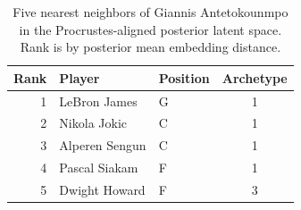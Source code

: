 \begin{table}[htbp]
  \centering\small
  \begin{tabular}{rllc}
    \toprule
    Rank & Player & Position & Archetype \\
    \midrule
    1 & LeBron James & G & 1 \\
    2 & Nikola Jokic & C & 1 \\
    3 & Alperen Sengun & C & 1 \\
    4 & Pascal Siakam & F & 1 \\
    5 & Dwight Howard & F & 3 \\
    \bottomrule
  \end{tabular}
  \caption{Five nearest neighbors of Giannis Antetokounmpo in the Procrustes-aligned posterior latent space. Rank is by posterior mean embedding distance.}
  \label{tab:Giannis_Antetokounmpo_neighbors}
\end{table}

